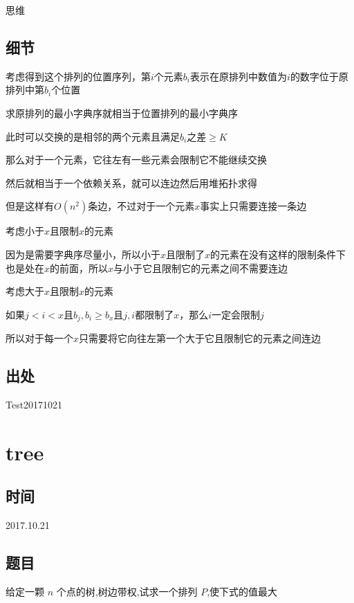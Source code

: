 \documentclass[a4paper]{article}
\begin{document}
		思维
		
	\subsection{细节}
		
		考虑得到这个排列的位置序列，第$i$个元素$b_i$表示在原排列中数值为$i$的数字位于原排列中第$b_i$个位置
		
		求原排列的最小字典序就相当于位置排列的最小字典序
		
		此时可以交换的是相邻的两个元素且满足$b_i$之差$\geq K$
		
		那么对于一个元素，它往左有一些元素会限制它不能继续交换
		
		然后就相当于一个依赖关系，就可以连边然后用堆拓扑求得
		
		但是这样有$O(n^2)$条边，不过对于一个元素$x$事实上只需要连接一条边
		
		考虑小于$x$且限制$x$的元素
		
		因为是需要字典序尽量小，所以小于$x$且限制了$x$的元素在没有这样的限制条件下也是处在$x$的前面，所以$x$与小于它且限制它的元素之间不需要连边
		
		考虑大于$x$且限制$x$的元素
		
		如果$j<i<x$且$b_j,b_i \geq b_x$且$j,i$都限制了$x$，那么$i$一定会限制$j$
		
		所以对于每一个$x$只需要将它向往左第一个大于它且限制它的元素之间连边
		
	\subsection{出处}
		
		Test20171021
	
	\newpage
	
	\section{tree}
		
	\subsection{时间}
		
		2017.10.21
		
	\subsection{题目}
		
		给定一颗 $n$ 个点的树,树边带权,试求一个排列 $P $,使下式的值最大
		
\end{document}
